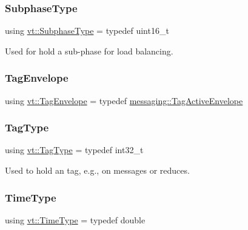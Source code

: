 \subsubsection{\texorpdfstring{Subphase\+Type}{SubphaseType}}
{\footnotesize\ttfamily using \hyperlink{namespacevt_ae78cbfdf1e57470e33eedb074f2beeba}{vt\+::\+Subphase\+Type} = typedef uint16\+\_\+t}



Used for hold a sub-\/phase for load balancing. 

\mbox{\label{namespacevt_a7b951ab92dca9319e12e3fc406ccb309}} 
\subsubsection{\texorpdfstring{Tag\+Envelope}{TagEnvelope}}
{\footnotesize\ttfamily using \hyperlink{namespacevt_a7b951ab92dca9319e12e3fc406ccb309}{vt\+::\+Tag\+Envelope} = typedef \hyperlink{structvt_1_1messaging_1_1_tag_active_envelope}{messaging\+::\+Tag\+Active\+Envelope}}

\mbox{\label{namespacevt_a84ab281dae04a52a4b243d6bf62d0e52}} 
\subsubsection{\texorpdfstring{Tag\+Type}{TagType}}
{\footnotesize\ttfamily using \hyperlink{namespacevt_a84ab281dae04a52a4b243d6bf62d0e52}{vt\+::\+Tag\+Type} = typedef int32\+\_\+t}



Used to hold an tag, e.\+g., on messages or reduces. 

\mbox{\label{namespacevt_a876a9d0cd5a952859c72de8a46881442}} 
\subsubsection{\texorpdfstring{Time\+Type}{TimeType}}
{\footnotesize\ttfamily using \hyperlink{namespacevt_a876a9d0cd5a952859c72de8a46881442}{vt\+::\+Time\+Type} = typedef double}

\mbox{\label{namespacevt_a913e1f07b5228dd8bb64040dc6dcea14}} 
